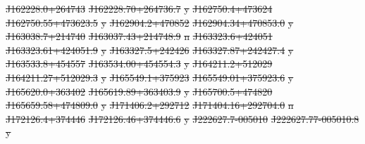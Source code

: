 \documentclass[11pt, a4paper]{book}
\providecommand{\DIFdeltex}[1]{{\protect\color{red}\sout{#1}}}                      %
\providecommand{\DIFdelFL}[1]{\DIFdel{#1}} %
\providecommand{\DIFdel}[1]{\texorpdfstring{\DIFdeltex{#1}}{}} %
\begin{document}
\DIFdelFL{J162228.0+264743 }%
\DIFdelFL{J162228.70+264736.7 }%
\DIFdelFL{y}%
\DIFdelFL{J162750.4+473624 }%
\DIFdelFL{J162750.55+473623.5 }%
\DIFdelFL{y}%
\DIFdelFL{J162904.2+470852 }%
\DIFdelFL{J162904.34+470853.0 }%
\DIFdelFL{y}%
\DIFdelFL{J163038.7+214740 }%
\DIFdelFL{J163037.43+214748.9 }%
\DIFdelFL{n}%
\DIFdelFL{J163323.6+424051 }%
\DIFdelFL{J163323.61+424051.9 }%
\DIFdelFL{y}%
\DIFdelFL{J163327.5+242426 }%
\DIFdelFL{J163327.87+242427.4 }%
\DIFdelFL{y}%
\DIFdelFL{J163533.8+454557 }%
\DIFdelFL{J163534.00+454554.3 }%
\DIFdelFL{y}%
\DIFdelFL{J164211.2+512029 }%
\DIFdelFL{J164211.27+512029.3 }%
\DIFdelFL{y}%
\DIFdelFL{J165549.1+375923 }%
\DIFdelFL{J165549.01+375923.6 }%
\DIFdelFL{y}%
\DIFdelFL{J165620.0+363402 }%
\DIFdelFL{J165619.89+363403.9 }%
\DIFdelFL{y}%
\DIFdelFL{J165700.5+474820 }%
\DIFdelFL{J165659.58+474809.0 }%
\DIFdelFL{y}%
\DIFdelFL{J171406.2+292712 }%
\DIFdelFL{J171404.16+292704.0 }%
\DIFdelFL{n}%
\DIFdelFL{J172126.4+374446 }%
\DIFdelFL{J172126.46+374446.6 }%
\DIFdelFL{y}%
\DIFdelFL{J222627.7-005010 }%
\DIFdelFL{J222627.77-005010.8 }%
\DIFdelFL{y}%
\end{document}
